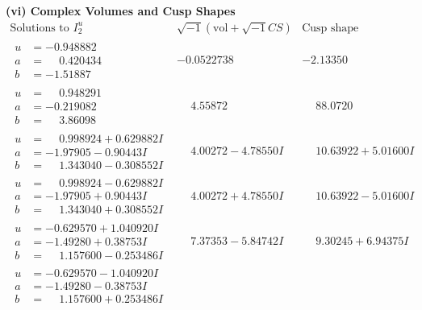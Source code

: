 \documentclass[1p]{elsarticle_modified}
\theoremstyle{definition}
\newcommand{\I}{\sqrt{-1}}
\begin{document}
\newpage\flushleft \textbf{(vi) Complex Volumes and Cusp Shapes}
$$\begin{array}{c|c|c}  
\text{Solutions to }I^u_{2}& \I (\text{vol} + \sqrt{-1}CS) & \text{Cusp shape}\\
 \hline 
\begin{aligned}
u &= -0.948882\phantom{ +0.000000I} \\
a &= \phantom{-}0.420434\phantom{ +0.000000I} \\
b &= -1.51887\phantom{ +0.000000I}\end{aligned}
 & -0.0522738\phantom{ +0.000000I} & -2.13350\phantom{ +0.000000I} \\ \hline\begin{aligned}
u &= \phantom{-}0.948291\phantom{ +0.000000I} \\
a &= -0.219082\phantom{ +0.000000I} \\
b &= \phantom{-}3.86098\phantom{ +0.000000I}\end{aligned}
 & \phantom{-}4.55872\phantom{ +0.000000I} & \phantom{-}88.0720\phantom{ +0.000000I} \\ \hline\begin{aligned}
u &= \phantom{-}0.998924 + 0.629882 I \\
a &= -1.97905 - 0.90443 I \\
b &= \phantom{-}1.343040 - 0.308552 I\end{aligned}
 & \phantom{-}4.00272 - 4.78550 I & \phantom{-}10.63922 + 5.01600 I \\ \hline\begin{aligned}
u &= \phantom{-}0.998924 - 0.629882 I \\
a &= -1.97905 + 0.90443 I \\
b &= \phantom{-}1.343040 + 0.308552 I\end{aligned}
 & \phantom{-}4.00272 + 4.78550 I & \phantom{-}10.63922 - 5.01600 I \\ \hline\begin{aligned}
u &= -0.629570 + 1.040920 I \\
a &= -1.49280 + 0.38753 I \\
b &= \phantom{-}1.157600 - 0.253486 I\end{aligned}
 & \phantom{-}7.37353 - 5.84742 I & \phantom{-}9.30245 + 6.94375 I \\ \hline\begin{aligned}
u &= -0.629570 - 1.040920 I \\
a &= -1.49280 - 0.38753 I \\
b &= \phantom{-}1.157600 + 0.253486 I\end{aligned}

\end{array}$$
\end{document}
